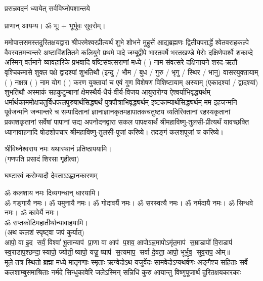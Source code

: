 {प्रसन्नवदनं ध्यायेत् सर्वविघ्नोपशान्तये}
 
प्राणान्  आयम्य।  ॐ भूः + भूर्भुवः॒ सुव॒रोम्।


ममोपात्तसमस्तदुरितक्षयद्वारा श्रीपरमेश्वरप्रीत्यर्थं शुभे शोभने मुहुर्त्ते आद्यब्रह्मणः
द्वितीयपरार्द्धे श्वेतवराहकल्पे वैवस्वतमन्वन्तरे अष्टाविंशतितमे कलियुगे प्रथमे पादे
जम्बूद्वीपे भारतवर्षे भरतखण्डे मेरोः दक्षिणेपार्श्वे शकाब्दे अस्मिन् वर्तमाने व्यावहारिके
 प्रभवादि षष्टिसंवत्सराणां मध्ये (  ) नाम संवत्सरे दक्षिनायने
शरद-ऋतौ  वृश्चिकमासे शुक्ल पक्षे द्वादश्यां शुभतिथौ
(इन्दु / भौम / बुध / गुरु / भृगु / स्थिर / भानु) वासरयुक्तायाम्
(  ) नक्षत्र (  ) नाम  योग  (  ) करण युक्तायां च एवं गुण विशेषण विशिष्टायाम्
अस्याम् (एकादश्यां / द्वादश्यां) शुभतिथौ
अस्माकं सहकुटुम्बानां क्षेमस्थैर्य-धैर्य-वीर्य-विजय आयुरारोग्य ऐश्वर्याभिवृद्ध्यर्थम्
 धर्मार्थकाममोक्ष\-चतुर्विधफलपुरुषार्थसिद्ध्यर्थं पुत्रपौत्राभि\-वृद्ध्यर्थम् इष्टकाम्यार्थसिद्ध्यर्थम्
मम इहजन्मनि पूर्वजन्मनि जन्मान्तरे च सम्पादितानां ज्ञानाज्ञानकृतमहा\-पातकचतुष्टय
व्यतिरिक्तानां रहस्यकृतानां प्रकाशकृतानां सर्वेषां पापानां सद्य अपनोदनद्वारा सकल
पापक्षयार्थं श्रीमहाविष्णु-तुलसी-प्रीत्यर्थं यावच्छक्ति ध्यानावाहनादि
षोडशोपचार श्रीमहाविष्णु-तुलसी-पूजां करिष्ये। तदङ्गं कलशपूजां च करिष्ये।


श्रीविघ्नेश्वराय नमः यथास्थानं प्रतिष्ठापयामि।\\
(गणपति प्रसादं शिरसा गृहीत्वा)


{घण्टारवं करोम्यादौ देवताऽऽह्वानकारणम्}

ॐ कलशाय नमः दिव्यगन्धान् धारयामि।\\
ॐ गङ्गायै नमः। ॐ यमुनायै नमः। ॐ गोदावर्यै नमः।  ॐ सरस्वत्यै नमः। ॐ नर्मदायै नमः। ॐ सिन्धवे नमः। ॐ कावेर्यै नमः।\\
 ॐ सप्तकोटिमहातीर्थान्यावाहयामि। \\

(अथ कलशं स्पृष्ट्वा जपं कुर्यात्) \\
आपो॒ वा इ॒द सर्वं॒ विश्वा॑ भू॒तान्याप॑ प्रा॒णा वा आप॑ प॒शव॒ आपो\-ऽन्न॒मापोऽमृ॑त॒माप॑ स॒म्राडापो॑ वि॒राडाप॑ स्व॒राडाप॒श्\-छन्दा॒स्यापो॒ ज्योती॒ष्यापो॒ यजू॒ष्याप॑ स॒त्यमाप॒ सर्वा॑ दे॒वता॒ आपो॒ भूर्भुव॒ सुव॒राप॒ ओम्॥\\

{मूले तत्र स्थितो ब्रह्मा मध्ये मातृगणाः स्मृताः}
{ऋग्वेदोऽथ यजुर्वेदः सामवेदोऽप्यथर्वणः}
{अङ्गैश्च सहिताः सर्वे कलशाम्बुसमाश्रिताः}
{नर्मदे सिन्धुकावेरि जलेऽस्मिन् सन्निधिं कुरु}
{आयान्तु विष्णुपूजार्थं दुरितक्षयकारकाः}

